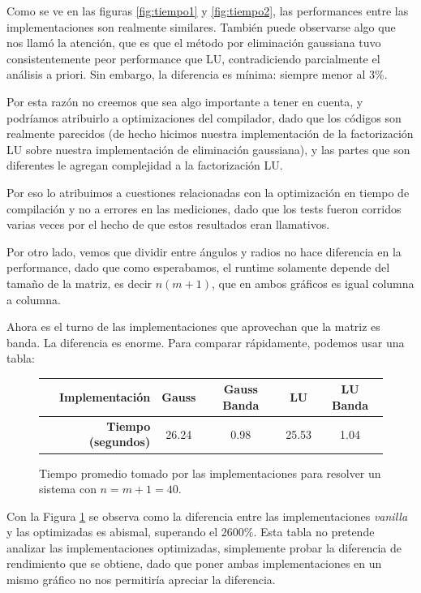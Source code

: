 Como se ve en las figuras \ref{fig:tiempo1} y \ref{fig:tiempo2}, las performances entre las implementaciones son realmente similares. También puede observarse algo que nos llamó la atención, que es que el método por eliminación gaussiana tuvo consistentemente peor performance que LU, contradiciendo parcialmente el análisis a priori. Sin embargo, la diferencia es mínima: siempre menor al 3\%.

Por esta razón no creemos que sea algo importante a tener en cuenta, y podríamos atribuirlo a optimizaciones del compilador, dado que los códigos son realmente parecidos (de hecho hicimos nuestra implementación de la factorización LU sobre nuestra implementación de eliminación gaussiana), y las partes que son diferentes le agregan complejidad a la factorización LU.

Por eso lo atribuimos a cuestiones relacionadas con la optimización en tiempo de compilación y no a errores en las mediciones, dado que los tests fueron corridos varias veces por el hecho de que estos resultados eran llamativos.


Por otro lado, vemos que dividir entre ángulos y radios no hace diferencia en la performance, dado que como esperabamos, el runtime solamente depende del tamaño de la matriz, es decir $n (m+1)$, que en ambos gráficos es igual columna a columna.


Ahora es el turno de las implementaciones que aprovechan que la matriz es banda.
La diferencia es enorme. Para comparar rápidamente, podemos usar una tabla:


\begin{figure}[H]
\centering
\begin{tabular}{|r | c  c  c  c|}
\hline
  \textbf{Implementación} & Gauss & Gauss Banda & LU & LU Banda\\ \hline
  \textbf{Tiempo (segundos)} & 26.24 & 0.98 & 25.53 & 1.04 \\
\hline
\end{tabular}

  \caption{\footnotesize{Tiempo promedio tomado por las implementaciones para resolver un sistema con $n = m+1 = 40$.}}
  \label{fig:tiempocomp}
\end{figure}

Con la Figura \ref{fig:tiempocomp} se observa como la diferencia entre las implementaciones \emph{vanilla} y las optimizadas es abismal, superando el 2600\%. Esta tabla no pretende analizar las implementaciones optimizadas, simplemente probar la diferencia de rendimiento que se obtiene, dado que poner ambas implementaciones en un mismo gráfico no nos permitiría apreciar la diferencia.


